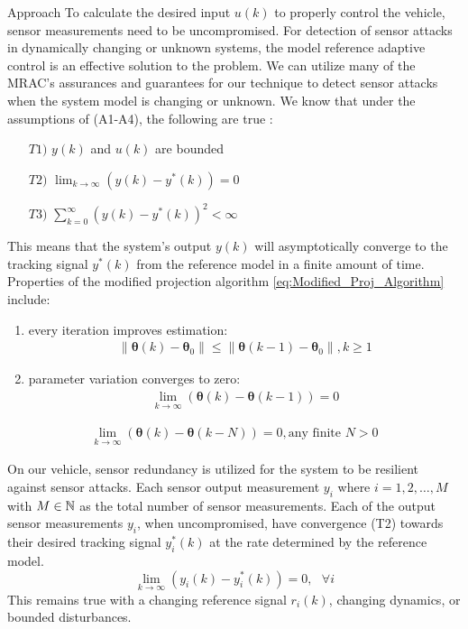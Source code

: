 \begin{section}{Approach}
To calculate the desired input $u(k)$ to properly control the vehicle, sensor measurements need to be uncompromised. For detection of sensor attacks in dynamically changing or unknown systems, the model reference adaptive control is an effective solution to the problem. We can utilize many of the MRAC's assurances and guarantees for our technique to detect sensor attacks when the system model is changing or unknown. We know that under the assumptions of (A1-A4), the following are true \cite{tao2003adaptive}:
	\begin{enumerate}[label=(\roman*),leftmargin=4\parindent]
	\label{assumtions_ensure}
	\item[$T1)$] $y(k)$ and $u(k)$ are bounded 
	\item[$T2)$] $\lim_{k\to\infty}(y(k)-y^*(k))=0$
	\label{Truth2}
	\item[$T3)$] $\sum_{k=0}^\infty(y(k)-y^*(k))^2<\infty$
	\end{enumerate}
This means that the system's output $y(k)$ will asymptotically converge to the tracking signal $y^*(k)$ from the reference model in a finite amount of time. Properties of the modified projection algorithm \eqref{eq:Modified_Proj_Algorithm} include:
    \begin{enumerate}[label=(\roman*),leftmargin=4\parindent]
	\item every iteration improves estimation:
	    \begin{align}
	        \|\bm{\theta}(k)-\bm{\theta}_0\|\leq\|\bm{\theta}(k-1)-\bm{\theta}_0\|, k\geq1 \nonumber
	    \end{align}
	\item parameter variation converges to zero:
	    \begin{align}
	        \lim_{k\to\infty}(\bm{\theta}(k)-\bm{\theta}(k-1))=0 \nonumber
	    \end{align}
	\end{enumerate}
	\begin{align}
	   \lim_{k\to\infty}(\bm{\theta}(k)-\bm{\theta}(k-N))=0, \text{any finite } N>0 \nonumber
	\end{align}

On our vehicle, sensor redundancy is utilized for the system to be resilient against sensor attacks. Each sensor output measurement $y_i$ where $i=1,2,\dots,M$ with $M \in \mathbb{N}$ as the total number of sensor measurements. Each of the output sensor measurements $y_i$, when uncompromised, have convergence (T2) towards their desired tracking signal $y_i^*(k)$ at the rate determined by the reference model. 
    \begin{equation}
    \label{multiple_output_tracking}
    \lim_{k\to\infty}(y_i(k)-y^*_i(k))=0, \text{ }\forall i
    \end{equation}
This remains true with a changing reference signal $r_i(k)$, changing dynamics, or bounded disturbances. 


\end{section}
